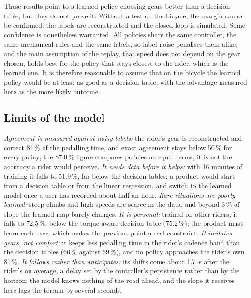 \documentclass[conference]{IEEEtran}
\newcommand{\pct}{\,\%}
\begin{document}
These results point to a learned policy choosing gears better than a decision table, but they do not prove it. Without a test on the bicycle, the margin cannot be confirmed: the labels are reconstructed and the closed loop is simulated. Some confidence is nonetheless warranted. All policies share the same controller, the same mechanical rules and the same labels, so label noise penalises them alike; and the main assumption of the replay, that speed does not depend on the gear chosen, holds best for the policy that stays closest to the rider, which is the learned one. It is therefore reasonable to assume that on the bicycle the learned policy would be at least as good as a decision table, with the advantage measured here as the more likely outcome.

\subsection{Limits of the model}
\emph{Agreement is measured against noisy labels:} the rider's gear is reconstructed and correct 84\pct{} of the pedalling time, and exact agreement stays below 50\pct{} for every policy; the 87.0\pct{} figure compares policies on equal terms, it is not the accuracy a rider would perceive.
\emph{It needs data before it helps:} with 16 minutes of training it falls to 51.9\pct{}, far below the decision tables; a product would start from a decision table or from the linear regression, and switch to the learned model once a user has recorded about half an hour.
\emph{Rare situations are poorly learned:} steep climbs and high speeds are scarce in the data, and beyond 3\pct{} of slope the learned map barely changes.
\emph{It is personal:} trained on other riders, it falls to 72.5\pct{}, below the torque-aware decision table (75.2\pct{}); the product must learn each user, which makes the previous point a real constraint.
\emph{It imitates gears, not comfort:} it keeps less pedalling time in the rider's cadence band than the decision tables (66\pct{} against 69\pct{}), and no policy approaches the rider's own 81\pct{}.
\emph{It follows rather than anticipates:} its shifts come about 1.7~s after the rider's on average, a delay set by the controller's persistence rather than by the horizon; the model knows nothing of the road ahead, and the slope it receives here lags the terrain by several seconds.
\end{document}
